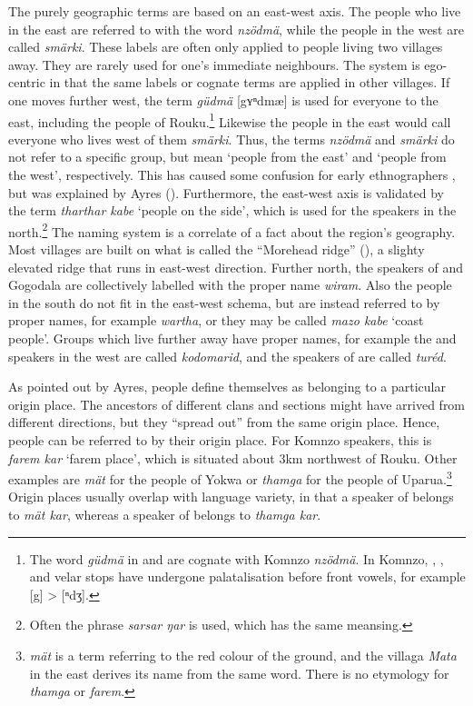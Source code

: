 The purely geographic terms are based on an east-west axis. The people who live in the east are referred to with the word \emph{nzödmä}, while the people in the west are called \emph{smärki}. These labels are often only applied to people living two villages away. They are rarely used for one's immediate neighbours. The system is ego-centric in that the same labels or cognate terms are applied in other villages. If one moves further west, the term \emph{güdmä} [{\ᵑ}gʏ{ⁿ}dmæ] is used for everyone to the east, including the people of Rouku.\footnote{The word \emph{güdmä} in  and  are cognate with Komnzo \emph{nzödmä}. In Komnzo, , , and  velar stops have undergone palatalisation before front vowels, for example [{\ᵑ}g] > [{ⁿ}dʒ].} Likewise the people in the east would call everyone who lives west of them \emph{smärki}. Thus, the terms \emph{nzödmä} and \emph{smärki} do not refer to a specific group, but mean `people from the east' and `people from the west', respectively. This has caused some confusion for early ethnographers \citep[36]{Williams:1936transfly}, but was explained by Ayres (\citeyear[132]{Ayres:ws}). Furthermore, the east-west axis is validated by the term \emph{tharthar kabe} `people on the side', which is used for the  speakers in the north.\footnote{Often the  phrase \emph{sarsar ŋar} is used, which has the same meansing.} The naming system is a correlate of a fact about the region's geography. Most villages are built on what is called the ``Morehead ridge'' (\citealt[15]{Paijmans:1971morehead}), a slighty elevated ridge that runs in east-west direction. Further north, the speakers of  and Gogodala are collectively labelled with the proper name \emph{wiram}. Also the people in the south do not fit in the east-west schema, but are instead referred to by proper names, for example \emph{wartha}, or they may be called \emph{mazo kabe} `coast people'. Groups which live further away have proper names, for example the  and  speakers in the west are called \emph{kodomarid}, and the speakers of  are called \emph{turéd}.

As pointed out by Ayres, people define themselves as belonging to a particular origin place. The ancestors of different clans and sections might have arrived from different directions, but they ``spread out'' from the same origin place. Hence, people can be referred to by their origin place. For Komnzo speakers, this is \emph{farem kar} `farem place', which is situated about 3km northwest of Rouku. Other examples are \emph{mät} for the people of Yokwa or \emph{thamga} for the people of Uparua.\footnote{\emph{mät} is a term referring to the red colour of the ground, and the villaga \emph{Mata} in the east derives its name from the same word. There is no etymology for \emph{thamga} or \emph{farem}.} Origin places usually overlap with language variety, in that a speaker of  belongs to \emph{mät kar}, whereas a speaker of  belongs to \emph{thamga kar}.

